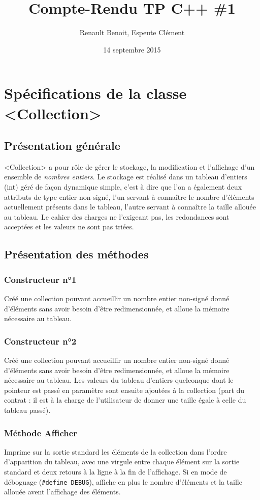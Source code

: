 \documentclass[10pt]{article}
\title{Compte-Rendu TP C++ \#1}
\author{{\sc Renault} Benoit, {\sc Espeute} Clément}
\date{14 septembre 2015}
\begin{document}
\pagestyle{fancy}
\maketitle

\section[Spécifications]{Spécifications de la classe <Collection>}

\subsection{Présentation générale}
<Collection> a pour rôle de gérer le stockage, la modification et l'affichage d'un ensemble de \emph{nombres entiers}. Le stockage est réalisé dans un tableau d'entiers (int) géré de façon dynamique simple, c'est à dire que l'on a également deux attributs de type entier non-signé, l'un servant à connaître le nombre d'éléments actuellement présents dans le tableau, l'autre servant à connaître la taille allouée au tableau. Le cahier des charges ne l'exigeant pas, les redondances sont acceptées et les valeurs ne sont pas triées.

\subsection{Présentation des méthodes}

\subsubsection*{Constructeur n°1}
Créé une collection pouvant accueillir un nombre entier non-signé donné d'éléments sans avoir besoin d'être redimensionnée, et alloue la mémoire nécessaire au tableau.

\subsubsection*{Constructeur n°2}
Créé une collection pouvant accueillir un nombre entier non-signé donné d'éléments sans avoir besoin d'être redimensionnée, et alloue la mémoire nécessaire au tableau. Les valeurs du tableau d'entiers quelconque dont le pointeur est passé en paramètre sont ensuite ajoutées à la collection (part du contrat : il est à la charge de l’utilisateur de donner une taille égale à celle du tableau passé).

\subsubsection*{Méthode Afficher}
Imprime sur la sortie standard les éléments de la collection dans l'ordre d’apparition du tableau, avec une virgule entre chaque élément sur la sortie standard et deux retours à la ligne à la fin de l'affichage. Si en mode de déboguage (\texttt{\#define DEBUG}), affiche en plus le nombre d’éléments et la taille allouée avent l’affichage des éléments.
\end{document}
